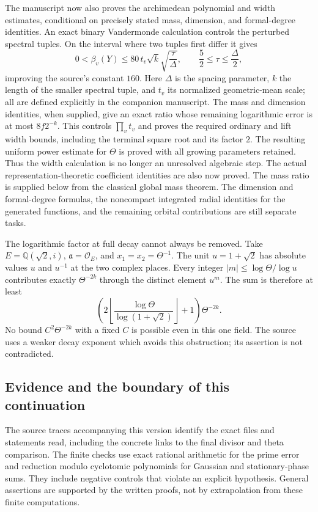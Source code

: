\documentclass[11pt,a4paper]{article}
\theoremstyle{remark}
\newcommand{\Q}{\mathbb Q}
\begin{document}
The manuscript now also proves the archimedean polynomial and
width estimates, conditional on precisely stated mass, dimension,
and formal-degree identities. An exact binary Vandermonde
calculation controls the perturbed spectral tuples. On the
interval where two tuples first differ it gives
\[
  0<\beta_v(Y)\le 80\,t_v\sqrt{k}
                         \sqrt{\frac{\tau}{\Delta}},
  \qquad \frac52\le\tau\le\frac{\Delta}{2},
\]
improving the source's constant $160$. Here $\Delta$ is the
spacing parameter, $k$ the length of the smaller spectral tuple,
and $t_v$ its normalized geometric-mean scale; all are defined
explicitly in the companion manuscript. The mass and dimension
identities, when supplied, give an exact ratio whose remaining
logarithmic error is at most $8f2^{-k}$. This controls
$\prod_v t_v$ and proves the required ordinary and lift width
bounds, including the terminal square root and its factor $2$.
The resulting uniform power estimate for $\Theta$ is proved
with all growing parameters retained. Thus the width calculation
is no longer an unresolved algebraic step. The actual
representation-theoretic coefficient identities are also now
proved. The mass ratio is supplied below from the classical global
mass theorem. The dimension and formal-degree formulas,
the noncompact integrated radial identities for the generated
functions, and the remaining orbital contributions are still
separate tasks.

The logarithmic factor at full decay cannot always be removed.
Take $E=\Q(\sqrt2,i)$, $\mathfrak a=\mathcal O_E$, and
$x_1=x_2=\Theta^{-1}$.
The unit $u=1+\sqrt2$ has absolute values $u$ and $u^{-1}$
at the two complex places. Every integer
$|m|\le\log\Theta/\log u$ contributes exactly
$\Theta^{-2k}$ through the distinct element $u^m$.
The sum is therefore at least
\[
 \left(2\left\lfloor\frac{\log\Theta}{\log(1+\sqrt2)}
               \right\rfloor+1\right)\Theta^{-2k}.
\]
No bound $C^2\Theta^{-2k}$ with a fixed $C$ is possible even
in this one field. The source uses a weaker decay exponent
which avoids this obstruction; its assertion is not contradicted.

\subsection{Evidence and the boundary of this continuation}

The source traces accompanying this version identify the exact
files and statements read, including the concrete links to the
final divisor and theta comparison. The finite checks use exact
rational arithmetic for the prime error and reduction modulo
cyclotomic polynomials for Gaussian and stationary-phase sums.
They include negative controls that violate an explicit
hypothesis. General assertions are supported by the written
proofs, not by extrapolation from these finite computations.
\end{document}
